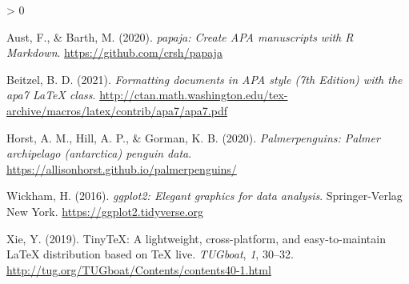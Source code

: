 \documentclass[jou]{apa7}
\newlength{\cslhangindent}
\newenvironment{CSLReferences}[2] %
 {%
  \setlength{\parindent}{0pt}
  \ifodd #1 \everypar{\setlength{\hangindent}{\cslhangindent}}\ignorespaces\fi
  \ifnum #2 > 0
  \setlength{\parskip}{#2\baselineskip}
  \fi
 }%
 {}
\begin{document}
\hypertarget{refs}{}
\begin{CSLReferences}{1}{0}
\leavevmode\hypertarget{ref-austbarth2020}{}%
Aust, F., \& Barth, M. (2020). \emph{{papaja}: {Create} {APA}
manuscripts with {R Markdown}}. \url{https://github.com/crsh/papaja}

\leavevmode\hypertarget{ref-weiss2021}{}%
Beitzel, B. D. (2021). \emph{Formatting documents in {APA} style (7th
{E}dition) with the apa7 LaTeX class}.
\url{http://ctan.math.washington.edu/tex-archive/macros/latex/contrib/apa7/apa7.pdf}

\leavevmode\hypertarget{ref-horst2020}{}%
Horst, A. M., Hill, A. P., \& Gorman, K. B. (2020).
\emph{Palmerpenguins: Palmer archipelago (antarctica) penguin data}.
\url{https://allisonhorst.github.io/palmerpenguins/}

\leavevmode\hypertarget{ref-wickham2016}{}%
Wickham, H. (2016). \emph{ggplot2: Elegant graphics for data analysis}.
Springer-Verlag New York. \url{https://ggplot2.tidyverse.org}

\leavevmode\hypertarget{ref-xie2019}{}%
Xie, Y. (2019). TinyTeX: A lightweight, cross-platform, and
easy-to-maintain LaTeX distribution based on TeX live. \emph{TUGboat},
\emph{1}, 30--32.
\url{http://tug.org/TUGboat/Contents/contents40-1.html}

\end{CSLReferences}
\end{document}
